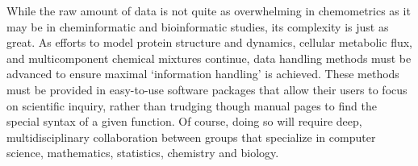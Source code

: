 \begin{doublespace}
While the raw amount of data is not quite as overwhelming in chemometrics as
it may be in cheminformatic and bioinformatic studies, its complexity is just
as great. As efforts to model protein structure and dynamics, cellular
metabolic flux, and multicomponent chemical mixtures continue, data handling
methods must be advanced to ensure maximal `information handling' is achieved.
These methods must be provided in easy-to-use software packages that allow
their users to focus on scientific inquiry, rather than trudging though manual
pages to find the special syntax of a given function. Of course, doing so
will require deep, multidisciplinary collaboration between groups that
specialize in computer science, mathematics, statistics, chemistry and
biology.
\end{doublespace}




